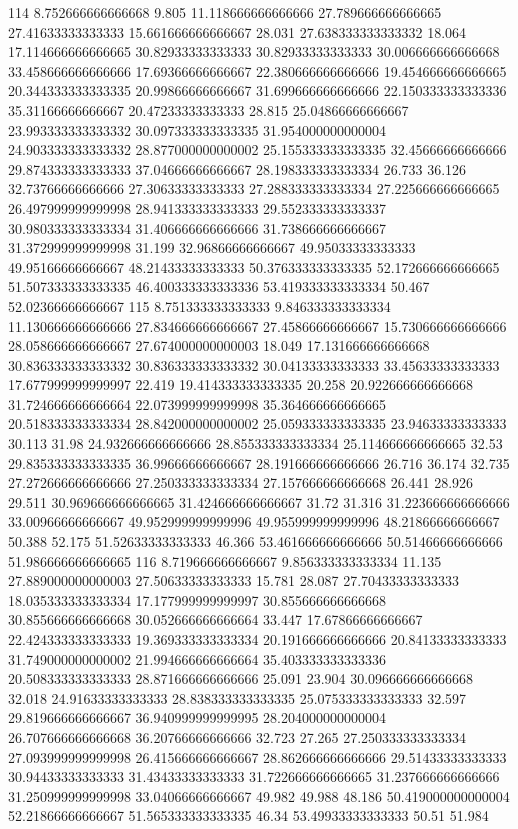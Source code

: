 114 8.752666666666668 9.805 11.118666666666666 27.789666666666665 27.41633333333333 15.661666666666667 28.031 27.638333333333332 18.064 17.114666666666665 30.82933333333333 30.82933333333333 30.006666666666668 33.458666666666666 17.69366666666667 22.380666666666666 19.454666666666665 20.344333333333335 20.99866666666667 31.699666666666666 22.150333333333336 35.31166666666667 20.47233333333333 28.815 25.04866666666667 23.993333333333332 30.097333333333335 31.954000000000004 24.903333333333332 28.877000000000002 25.155333333333335 32.45666666666666 29.874333333333333 37.04666666666667 28.198333333333334 26.733 36.126 32.73766666666666 27.30633333333333 27.288333333333334 27.225666666666665 26.497999999999998 28.941333333333333 29.552333333333337 30.980333333333334 31.406666666666666 31.738666666666667 31.372999999999998 31.199 32.96866666666667 49.95033333333333 49.95166666666667 48.21433333333333 50.376333333333335 52.172666666666665 51.507333333333335 46.400333333333336 53.419333333333334 50.467 52.02366666666667
115 8.751333333333333 9.846333333333334 11.130666666666666 27.834666666666667 27.45866666666667 15.730666666666666 28.058666666666667 27.674000000000003 18.049 17.131666666666668 30.836333333333332 30.836333333333332 30.04133333333333 33.45633333333333 17.677999999999997 22.419 19.414333333333335 20.258 20.922666666666668 31.724666666666664 22.073999999999998 35.364666666666665 20.518333333333334 28.842000000000002 25.059333333333335 23.94633333333333 30.113 31.98 24.932666666666666 28.855333333333334 25.114666666666665 32.53 29.835333333333335 36.99666666666667 28.191666666666666 26.716 36.174 32.735 27.272666666666666 27.250333333333334 27.157666666666668 26.441 28.926 29.511 30.969666666666665 31.424666666666667 31.72 31.316 31.223666666666666 33.00966666666667 49.952999999999996 49.955999999999996 48.21866666666667 50.388 52.175 51.52633333333333 46.366 53.461666666666666 50.51466666666666 51.986666666666665
116 8.719666666666667 9.856333333333334 11.135 27.889000000000003 27.50633333333333 15.781 28.087 27.70433333333333 18.035333333333334 17.177999999999997 30.855666666666668 30.855666666666668 30.052666666666664 33.447 17.67866666666667 22.424333333333333 19.369333333333334 20.191666666666666 20.84133333333333 31.749000000000002 21.994666666666664 35.403333333333336 20.508333333333333 28.871666666666666 25.091 23.904 30.096666666666668 32.018 24.91633333333333 28.838333333333335 25.075333333333333 32.597 29.819666666666667 36.940999999999995 28.204000000000004 26.707666666666668 36.20766666666666 32.723 27.265 27.250333333333334 27.093999999999998 26.415666666666667 28.862666666666666 29.51433333333333 30.94433333333333 31.43433333333333 31.722666666666665 31.237666666666666 31.250999999999998 33.04066666666667 49.982 49.988 48.186 50.419000000000004 52.21866666666667 51.565333333333335 46.34 53.49933333333333 50.51 51.984
